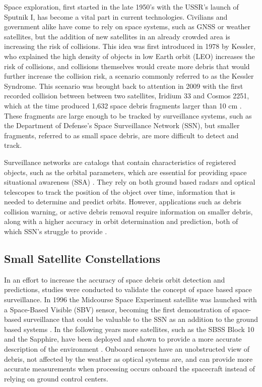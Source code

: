\documentclass[conference]{IEEEtran}
\begin{document}
		Space exploration, first started in the late 1950's with the USSR's launch of Sputnik I, has become a vital part in current technologies.
		Civilians and government alike have come to rely on space systems, such as GNSS or weather satellites, but the addition of new satellites in an already crowded area is increasing the risk of collisions. 
		This idea was first introduced in 1978 by Kessler, who explained the high density of objects in low Earth orbit (LEO) increases the risk of collisions, and collisions themselves would create more debris that would further increase the collision risk, a scenario commonly referred to as the Kessler Syndrome.
		This scenario was brought back to attention in 2009 with the first recorded collision between between two satellites, Iridium 33 and Cosmos 2251, which at the time produced 1,632 space debris fragments larger than 10 cm \cite{Wang2010AnalysisOD}. These fragments are large enough to be tracked by surveillance systems, such as the Department of Defense’s Space Surveillance Network (SSN), but smaller fragments, referred to as small space debris, are more difficult to detect and track. 
		
		Surveillance networks are catalogs that contain characteristics of registered objects, such as the orbital parameters, which are essential for providing space situational awareness (SSA) \cite{2019_lidar}.
		They rely on both ground based radars and optical telescopes to track the position of the object over time, information that is needed to determine and predict orbits.
		However, applications such as debris collision warning, or active debris removal require information on smaller debris, along with a higher accuracy in orbit determination and prediction, both of which SSN's struggle to provide \cite{2020_ml_approach}.
		
	
	\subsection{Small Satellite Constellations}
		In an effort to increase the accuracy of space debris orbit detection and predictions, studies were conducted to validate the concept of space based space surveillance. In 1996 the Midcourse Space Experiment satellite was launched with a Space-Based Visible (SBV) sensor, becoming the first demonstration of space-based surveillance that could be valuable to the SSN as an addition to the ground based systems \cite{stokes2000space}. In the following years more satellites, such as the SBSS Block 10 and the Sapphire, have been deployed and shown to provide a more accurate description of the environment  \cite{multi_spacecraft_2016}. 
		Onboard sensors have an unobstructed view of debris, not affected by the weather as optical systems are, and can provide more accurate measurements when processing occurs onboard the spacecraft instead of relying on ground control centers.
		
\end{document}

